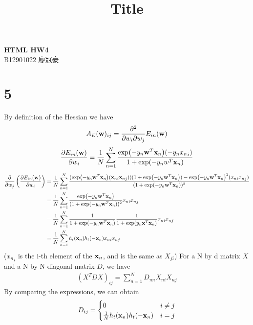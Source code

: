 \documentclass[11pt]{article}
\theoremstyle{definition}
\begin{document}
\setcounter{section}{0}
\title{Title}

\thispagestyle{empty}
\begin{center}
  {\large \bf HTML HW4} \\ 
  B12901022 廖冠豪
\end{center}
\section*{5}
By definition of the Hessian we have
\begin{align*}
  A_E(\vb{w})_{ij} = \frac{\partial^2 }{\partial w_i\partial w_j}E_{in}(\vb{w}) \\ 
\end{align*}
\begin{align*}
  \pdv{E_{in}(\vb{w})}{w_i} &= \frac{1}{N}\sum_{n = 1}^N\frac{\exp(-y_n\vb{w}^T\vb{x}_n)(-y_n{{x}_n}_i)}{1 + \exp(-y_n{w}^T\vb{x}_n)} \\ 
\end{align*}
\begin{align*}
  \pdv{}{w_j}\left(\pdv{E_{in}(\vb{w})}{w_i}\right) &= \frac{1}{N}\sum^N_{n = 1}\frac{(\exp(-y_n\vb{w}^T\vb{x}_n)({\vb{x}_n}_i{\vb{x}_n}_j))(1 + \exp(-y_n\vb{w}^T\vb{x}_n)) - {\exp(-y_n\vb{w}^T\vb{x}_n)}^2({x_n}_i{x_n}_j)}{(1 + \exp(-y_n\vb{w}^T\vb{x}_n))^2} \\ 
  &=\frac{1}{N}\sum^N_{n=1} \frac{\exp(-y_n\vb{w}^T\vb{x}_n)}{(1 + \exp(-y_n\vb{w}^T\vb{x}_n))^2}{x_n}_i{x_n}_j \\ 
  &= \frac{1}{N}\sum^N_{n=1} \frac{1}{1 + \exp(-y_n\vb{w}^T\vb{x}_n)}\frac{1}{1 + \exp(y_n\vb{x}^T\vb{x}_n)}{x_n}_i{x_n}_j \\ 
  &= \frac{1}{N}\sum^N_{n = 1}h_t(\vb{x}_n)h_t(-\vb{x}_n){x_n}_i{x_n}_j \\ 
\end{align*}
(${x_n}_i$ is the i-th element of the $\vb{x}_n$, and is the same as $X_{ji}$)
For a N by d matrix $X$ and a N by N diagonal matrix $D$, we have
\begin{align*}
  {(X^TDX)}_{ij} = \sum^N_{n = 1}D_{nn}X_{ni}X_{nj}
\end{align*}
By comparing the expressions, we can obtain
\begin{align*}
  D_{ij} = 
  \begin{cases}
    0 & i \neq j\\
    \frac{1}{N}h_t(\vb{x}_n)h_t(-\vb{x}_n) & i = j\\
  \end{cases}
\end{align*}
\newpage 
\end{document}
